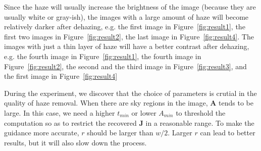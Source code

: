 \documentclass{article}
\begin{document}
Since the haze will usually increase the brightness of the image (because they are usually white or gray-ish), the images with a large amount of haze will become relatively darker after dehazing, e.g. the first image in Figure~\ref{fig:result1}, the first two images in Figure~\ref{fig:result2},  the last image in Figure~\ref{fig:result4}. The images with just a thin layer of haze will have a better contrast after dehazing, e.g. the fourth image in Figure~\ref{fig:result1}, the fourth image in Figure~\ref{fig:result2}, the second and the third image in Figure~\ref{fig:result3}, and the first image in Figure~\ref{fig:result4}

During the experiment, we discover that the choice of parameters is crutial in the quality of haze removal. When there are sky regions in the image, $\mathbf{A}$ tends to be large. In this case, we need a higher $t_{min}$ or lower $A_{min}$ to threshold the computation so as to restrict the recovered $\mathbf{J}$ in a reasonable range. To make the guidance more accurate, $r$ should be larger than $w/2$. Larger $r$ can lead to better results, but it will also slow down the process.
\end{document}
